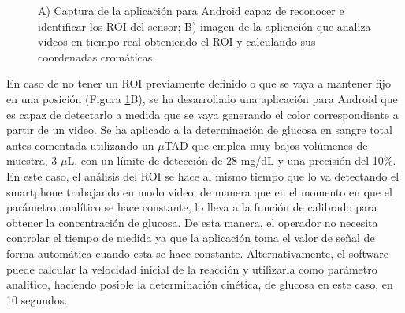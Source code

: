 \documentclass{article}
\begin{document}
\begin{figure}[h]
	\caption{A) Captura de la aplicación para Android capaz de reconocer e identificar los ROI del sensor; B) imagen de la aplicación que analiza videos en tiempo real obteniendo el ROI y calculando sus coordenadas cromáticas.}
	\label{fig:app}
\end{figure}

En caso de no tener un ROI previamente definido o que se vaya a mantener fijo en una posición (Figura \ref{fig:app}B), se ha desarrollado una aplicación para Android que es capaz de detectarlo a medida que se vaya generando el color correspondiente a partir de un video. Se ha aplicado a la determinación de glucosa en sangre total antes comentada utilizando un $\mu$TAD que emplea muy bajos volúmenes de muestra, 3 $\mu$L, con un límite de detección de 28 mg/dL y una precisión del 10\%. En este caso, el análisis del ROI se hace al mismo tiempo que lo va detectando el smartphone trabajando en modo video, de manera que en el momento en que el parámetro analítico se hace constante, lo lleva a la función de calibrado para obtener la concentración de glucosa. De esta manera, el operador no necesita controlar el tiempo de medida ya que la aplicación toma el valor de señal de forma automática cuando esta se hace constante. Alternativamente, el software puede calcular la velocidad inicial de la reacción y utilizarla como parámetro analítico, haciendo posible la determinación cinética, de glucosa en este caso, en 10 segundos.











	
\end{document}
